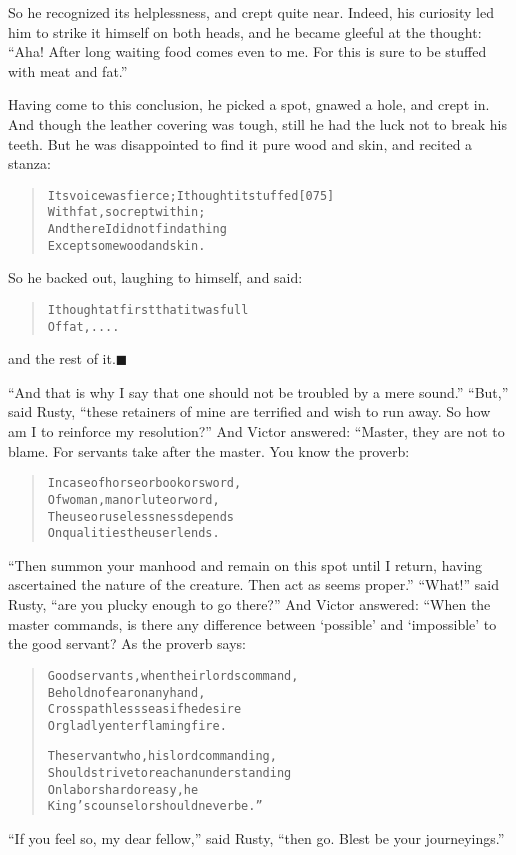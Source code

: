 \documentclass[article, twoside, 14pt]{memoir}
\newcommand{\qed}{\hfill \ensuremath{\blacksquare}}
\renewenvironment{verbatim}{%
\begin{quote}%
\vskip -10pt%
\begin{alltt}\normalfont\large}{\end{alltt}%
\end{quote}%
\vskip -10pt
} %
\begin{document}
So he recognized its helplessness, and crept quite near. Indeed,
his curiosity led him to strike it himself on both heads, and he
became gleeful at the thought:
``Aha! After long waiting food comes even to me. For this is sure to be stuffed with meat and fat.''

Having come to this conclusion, he picked a spot, gnawed a hole,
and crept in. And though the leather covering was tough, still he
had the luck not to break his teeth. But he was disappointed to
find it pure wood and skin, and recited a stanza:

\begin{verbatim}
Its voice was fierce; I thought it stuffed              [075]
    With fat, so crept within;
And there I did not find a thing
    Except some wood and skin.
\end{verbatim}
So he backed out, laughing to himself, and said:

\begin{verbatim}
I thought at first that it was full
Of fat, ....
\end{verbatim}
and the rest of it.\hyperref[s3]{\qed}

``And that is why I say that one should not be troubled by a mere sound.''
``But,'' said Rusty,
``these retainers of mine are terrified and wish to run away. So how am I to reinforce my resolution?''
And Victor answered: “Master, they are not to blame. For servants
take after the master. You know the proverb:

\begin{verbatim}
In case of horse or book or sword,
Of woman, man or lute or word,
The use or uselessness depends
On qualities the user lends.
\end{verbatim}
``Then summon your manhood and remain on this spot until I return, having ascertained the nature of the creature. Then act as seems proper.''
``What!'' said Rusty, ``are you plucky enough to go there?'' And
Victor answered: “When the master commands, is there any difference
between `possible' and `impossible' to the good servant? As the
proverb says:

\begin{verbatim}
Good servants, when their lords command,
Behold no fear on any hand,
Cross pathless seas if he desire
Or gladly enter flaming fire.

The servant who, his lord commanding,
Should strive to reach an understanding
On labors hard or easy, he
King's counselor should never be.”
\end{verbatim}
``If you feel so, my dear fellow,'' said Rusty,
``then go. Blest be your journeyings.''
\end{document}
